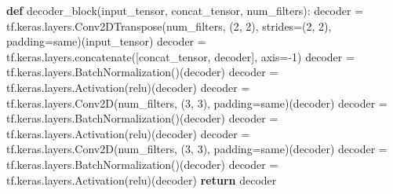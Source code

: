 \documentclass[
  letterpaper,
  DIV=11,
  numbers=noendperiod]{scrreprt}
\newenvironment{Shaded}{\begin{snugshade}}{\end{snugshade}}
\newcommand{\ControlFlowTok}[1]{\textcolor[rgb]{0.00,0.23,0.31}{\textbf{#1}}}
\newcommand{\DecValTok}[1]{\textcolor[rgb]{0.68,0.00,0.00}{#1}}
\newcommand{\KeywordTok}[1]{\textcolor[rgb]{0.00,0.23,0.31}{\textbf{#1}}}
\newcommand{\NormalTok}[1]{\textcolor[rgb]{0.00,0.23,0.31}{#1}}
\newcommand{\OperatorTok}[1]{\textcolor[rgb]{0.37,0.37,0.37}{#1}}
\newcommand{\StringTok}[1]{\textcolor[rgb]{0.13,0.47,0.30}{#1}}
\begin{document}
\begin{Shaded}
\begin{Highlighting}[]
\KeywordTok{def}\NormalTok{ decoder\_block(input\_tensor, concat\_tensor, num\_filters):}
\NormalTok{    decoder }\OperatorTok{=}\NormalTok{ tf.keras.layers.Conv2DTranspose(num\_filters, (}\DecValTok{2}\NormalTok{, }\DecValTok{2}\NormalTok{), strides}\OperatorTok{=}\NormalTok{(}\DecValTok{2}\NormalTok{, }\DecValTok{2}\NormalTok{), padding}\OperatorTok{=}\StringTok{\textquotesingle{}same\textquotesingle{}}\NormalTok{)(input\_tensor)}
\NormalTok{    decoder }\OperatorTok{=}\NormalTok{ tf.keras.layers.concatenate([concat\_tensor, decoder], axis}\OperatorTok{={-}}\DecValTok{1}\NormalTok{)}
\NormalTok{    decoder }\OperatorTok{=}\NormalTok{ tf.keras.layers.BatchNormalization()(decoder)}
\NormalTok{    decoder }\OperatorTok{=}\NormalTok{ tf.keras.layers.Activation(}\StringTok{\textquotesingle{}relu\textquotesingle{}}\NormalTok{)(decoder)}
\NormalTok{    decoder }\OperatorTok{=}\NormalTok{ tf.keras.layers.Conv2D(num\_filters, (}\DecValTok{3}\NormalTok{, }\DecValTok{3}\NormalTok{), padding}\OperatorTok{=}\StringTok{\textquotesingle{}same\textquotesingle{}}\NormalTok{)(decoder)}
\NormalTok{    decoder }\OperatorTok{=}\NormalTok{ tf.keras.layers.BatchNormalization()(decoder)}
\NormalTok{    decoder }\OperatorTok{=}\NormalTok{ tf.keras.layers.Activation(}\StringTok{\textquotesingle{}relu\textquotesingle{}}\NormalTok{)(decoder)}
\NormalTok{    decoder }\OperatorTok{=}\NormalTok{ tf.keras.layers.Conv2D(num\_filters, (}\DecValTok{3}\NormalTok{, }\DecValTok{3}\NormalTok{), padding}\OperatorTok{=}\StringTok{\textquotesingle{}same\textquotesingle{}}\NormalTok{)(decoder)}
\NormalTok{    decoder }\OperatorTok{=}\NormalTok{ tf.keras.layers.BatchNormalization()(decoder)}
\NormalTok{    decoder }\OperatorTok{=}\NormalTok{ tf.keras.layers.Activation(}\StringTok{\textquotesingle{}relu\textquotesingle{}}\NormalTok{)(decoder)}
    \ControlFlowTok{return}\NormalTok{ decoder}


\end{Highlighting}
\end{Shaded}
\end{document}

